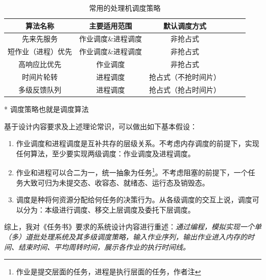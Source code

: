 \documentclass[UTF8]{ctexart}
\begin{document}
\begin{table}[htbp]
    \caption{常用的处理机调度策略}
    \centering

    \begin{threeparttable}
        \begin{tabular}{cccccc}
            \toprule
            算法名称      & 主要适用范围     & 默认调度方式     \\
            \midrule
            先来先服务     & 作业调度\&进程调度 & 非抢占式       \\
            短作业（进程）优先 & 作业调度\&进程调度 & 非抢占式       \\
            高响应比优先    & 作业调度       & 非抢占式       \\
            时间片轮转     & 进程调度       & 抢占式（不抢时间片） \\
            多级反馈队列    & 进程调度       & 抢占式（抢占时间片） \\
            \bottomrule
        \end{tabular}

        \begin{tablenotes}
            \item [*]   调度策略也就是调度算法
        \end{tablenotes}

    \end{threeparttable}
    \qquad
\end{table}

基于设计内容要求及上述理论常识，可以做出如下基本假设：
\begin{enumerate}
    \item 作业调度和进程调度是互补共存的层级关系。不考虑内存调度的前提下，实现任何算法，至少要实现两级调度：作业调度及进程调度。
    \item 作业和进程可以合二为一，统一抽象为任务\footnote{作业是提交层面的任务，进程是执行层面的任务，作者注}。不考虑阻塞的前提下，一个任务大致可归为未提交态、收容态、就绪态、运行态及销毁态。
    \item 调度是种将何资源分配给何任务的决策行为。从各级调度的交互上说，调度可以分为：本级进行调度、移交上层调度及委托下层调度。
\end{enumerate}

综上，我对《任务书》要求的系统设计内容进行重述：\emph{通过编程，模拟实现一个单（多）道批处理系统及其多级调度策略，输入作业序列，输出作业进入内存的时间、结束时间、平均周转时间，展示各作业的执行时间线。}
\end{document}
